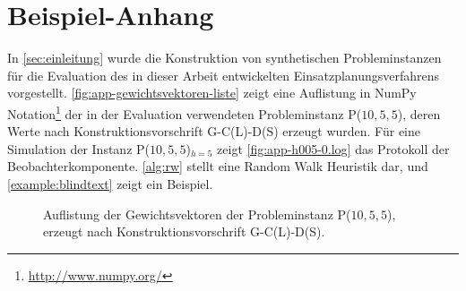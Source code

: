%
\ifx\fulldocument\undefined
  
  \pagestyle{scrheadings}                                                         %
  \appendix
\fi
%
%
\chapter{Beispiel-Anhang}\label{app:example}
%
In \autoref{sec:einleitung} wurde die Konstruktion von synthetischen Probleminstanzen für die Evaluation des in dieser Arbeit entwickelten Einsatzplanungsverfahrens vorgestellt. \autoref{fig:app-gewichtsvektoren-liste} zeigt eine Auflistung in NumPy Notation\footnote{\url{http://www.numpy.org/}} der in der Evaluation verwendeten Probleminstanz \textsf{P($10,5,5$)}, deren Werte nach Konstruktionsvorschrift \textsf{G-C(L)-D(S)} erzeugt wurden. Für eine Simulation der Instanz \textsf{P($10,5,5$)$_{h=5}$} zeigt \autoref{fig:app-h005-0.log} das Protokoll der Beobachterkomponente. \autoref{alg:rw} stellt eine Random Walk Heuristik dar, und \autoref{example:blindtext} zeigt ein Beispiel.
%
\begin{figure}[tbhp]
  \begin{example}\label{example:blindtext}
    \blindtext
  \end{example}
\end{figure}
%
%
\begin{figure}
  \hspace{\fill}
  \begin{minipage}{0.35\textwidth}
    
  \end{minipage}
  \hspace{\fill}
  \begin{minipage}{0.35\textwidth}
    
  \end{minipage}
  \hspace{\fill}
  \caption[\textsf{P($10,5,5$)} (Gewichtsvektoren)]{Auflistung der Gewichtsvektoren der Probleminstanz \textsf{P($10,5,5$)}, erzeugt nach Konstruktionsvorschrift \textsf{G-C(L)-D(S)}.}
  \label{fig:app-gewichtsvektoren-liste}
\end{figure}
